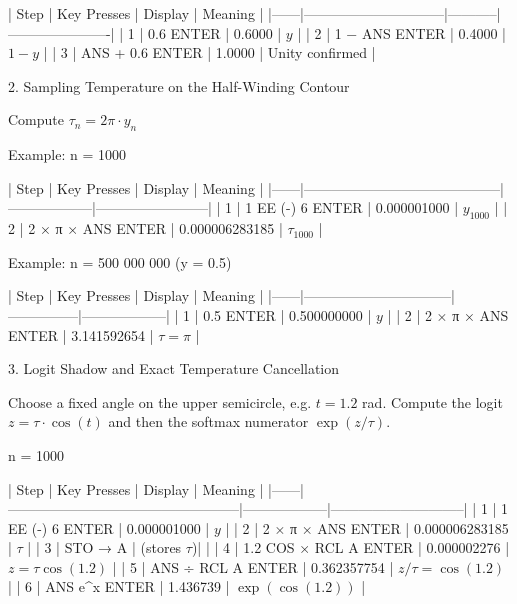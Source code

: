 | Step | Key Presses                  | Display   | Meaning              |
|------|------------------------------|-----------|----------------------|
| 1    | 0.6 ENTER                | 0.6000   | \(y\)               |
| 2    | 1 − ANS ENTER        | 0.4000   | \(1-y\)             |
| 3    | ANS + 0.6 ENTER      | 1.0000   | Unity confirmed     |

2. Sampling Temperature on the Half-Winding Contour

Compute \(\tau_n = 2\pi \cdot y_n\)

Example: n = 1000

| Step | Key Presses                              | Display          | Meaning                |
|------|------------------------------------------|------------------|------------------------|
| 1    | 1 EE (-) 6 ENTER               | 0.000001000     | \(y_{1000}\)          |
| 2    | 2 × π × ANS ENTER            | 0.000006283185  | \(\tau_{1000}\)       |

Example: n = 500 000 000 (y = 0.5)

| Step | Key Presses                    | Display       | Meaning          |
|------|--------------------------------|---------------|------------------|
| 1    | 0.5 ENTER                  | 0.500000000  | \(y\)           |
| 2    | 2 × π × ANS ENTER  | 3.141592654  | \(\tau = \pi\)  |

3. Logit Shadow and Exact Temperature Cancellation

Choose a fixed angle on the upper semicircle, e.g. \(t = 1.2\) rad.  
Compute the logit \(z = \tau \cdot \cos(t)\) and then the softmax numerator \(\exp(z/\tau)\).

n = 1000

| Step | Key Presses                                      | Display          | Meaning                     |
|------|--------------------------------------------------|------------------|-----------------------------|
| 1    | 1 EE (-) 6 ENTER                       | 0.000001000     | \(y\)                      |
| 2    | 2 × π × ANS ENTER                    | 0.000006283185  | \(\tau\)                   |
| 3    | STO → A                                    | (stores \(\tau\))|                             |
| 4    | 1.2 COS × RCL A ENTER                | 0.000002276     | \(z = \tau\cos(1.2)\)      |
| 5    | ANS ÷ RCL A ENTER                      | 0.362357754     | \(z/\tau = \cos(1.2)\)     |
| 6    | ANS e^x ENTER                              | 1.436739       | \(\exp(\cos(1.2))\)        |

